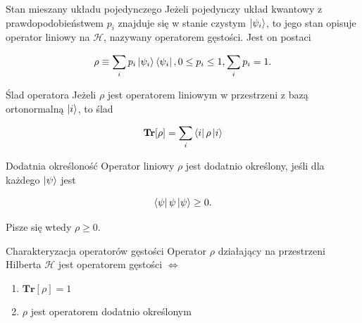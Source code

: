 \documentclass{beamer}
\begin{document}
\begin{frame}
    \begin{exampleblock}{Stan mieszany układu pojedynczego}
        Jeżeli pojedynczy układ kwantowy z prawdopodobieństwem $p_{i}$ znajduje się w stanie czystym $\ket{\psi_{i}}$, to jego stan opisuje operator liniowy na $\mathcal{H}$, nazywany operatorem gęstości. Jest on postaci

        $$
            \rho \equiv \sum \limits_{i} p_{i} \ket{\psi_{i}} \bra{\psi_{i}}, 0 \leq p_{i} \leq 1, \sum \limits_{i} p_{i} = 1.
        $$
    \end{exampleblock}
\end{frame}

\begin{frame}
    \begin{exampleblock}{Ślad operatora}
        Jeżeli $\rho$ jest operatorem liniowym w przestrzeni z bazą ortonormalną $\ket{i}$, to ślad

        $$
            \textbf{Tr}[\rho] = \sum \limits_{i} \bra{i} \rho \ket{i}
        $$
    \end{exampleblock}
\end{frame}

\begin{frame}
    \begin{exampleblock}{Dodatnia określoność}
        Operator liniowy $\rho$ jest dodatnio określony, jeśli dla każdego $\ket{\psi}$ jest

        $$
            \bra{\psi} \psi \ket{\psi} \geq 0.
        $$

        Pisze się wtedy $\rho \geq 0$.
    \end{exampleblock}
\end{frame}

\begin{frame}
    \begin{alertblock}{Charakteryzacja operatorów gęstości}
        Operator $\rho$ działający na przestrzeni Hilberta $\mathcal{H}$ jest operatorem gęstości $\Leftrightarrow$

        \begin{enumerate}
            \item $\textbf{Tr}[\rho] = 1$
            \item $\rho$ jest operatorem dodatnio określonym
        \end{enumerate}
    \end{alertblock}
\end{frame}
\end{document}
